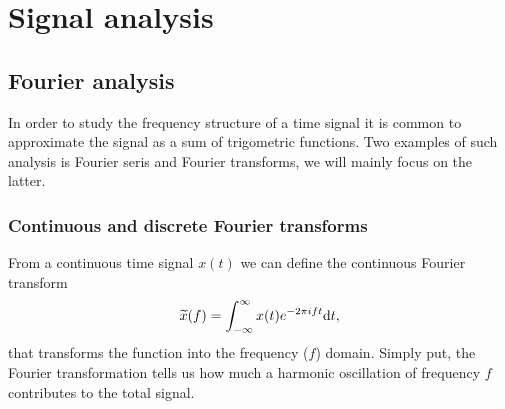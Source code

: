 \chapter{Signal analysis}
\section{Fourier analysis}
In order to study the frequency structure of a time signal it is common 
to approximate the signal as a sum of trigometric functions. Two examples
of such analysis is Fourier seris and Fourier transforms, we will mainly
focus on the latter.
\subsection{Continuous and discrete Fourier transforms}
From a continuous time signal $x(t)$ we can define the continuous Fourier transform  
\begin{equation} \label{eqSA:cf}
\widetilde{x}(f) = \int_{-\infty}^{\infty} x(t) e^{-2 \pi i f t} \mathrm{d} t, 
\end{equation}
that transforms the function into the frequency ($f$) domain.
Simply put, the Fourier transformation tells us how much a harmonic oscillation 
of frequency $f$ contributes to the total signal. 

